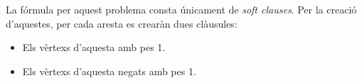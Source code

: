 \documentclass[../informe.tex]{subfiles}
\begin{document}
La fórmula per aquest problema consta únicament de \textit{soft clauses}. Per la creació d'aquestes, per cada aresta es crearàn dues clàusules:
\begin{itemize}
  \item Els vèrtexs d'aquesta amb pes 1.
  \item Els vèrtexs d'aquesta negats amb pes 1.
\end{itemize}
\end{document}
